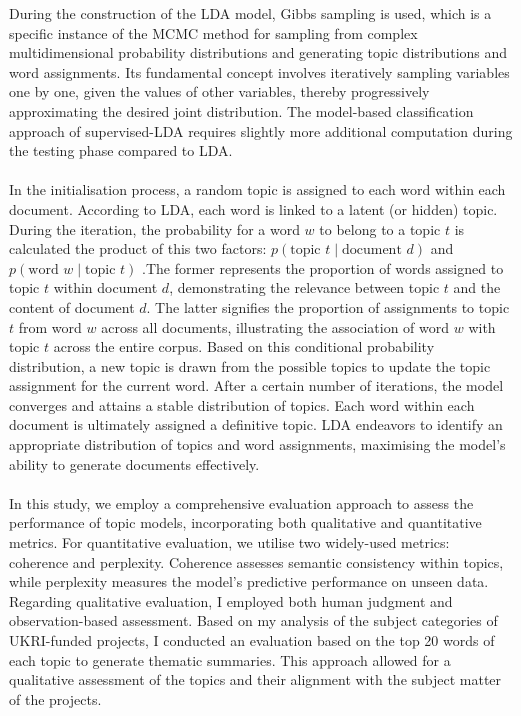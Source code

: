 \documentclass[12pt,twoside]{article}
\begin{document}
During the construction of the LDA model, Gibbs sampling is used, which is a specific instance of the MCMC method for sampling from complex multidimensional probability distributions and generating topic distributions and word assignments. Its fundamental concept involves iteratively sampling variables one by one, given the values of other variables, thereby progressively approximating the desired joint distribution. The model-based classification approach of supervised-LDA requires slightly more additional computation during the testing phase compared to LDA\cite{Lakshminarayanan2011}.\\\\

In the initialisation process, a random topic is assigned to each word within each document. According to LDA, each word is linked to a latent (or hidden) topic. During the iteration, the probability for a word $w$ to belong to a topic $t$ is calculated the product of this two factors: $p(\text{topic } t \mid \text{document } d)$ and $p(\text{word } w \mid \text{topic } t)$ \cite{Kulshrestha2019}.The former represents the proportion of words assigned to topic $t$ within document $d$, demonstrating the relevance between topic $t$ and the content of document $d$. The latter signifies the proportion of assignments to topic $t$ from word $w$ across all documents, illustrating the association of word $w$ with topic $t$ across the entire corpus. Based on this conditional probability distribution, a new topic is drawn from the possible topics to update the topic assignment for the current word. After a certain number of iterations, the model converges and attains a stable distribution of topics. Each word within each document is ultimately assigned a definitive topic. LDA endeavors to identify an appropriate distribution of topics and word assignments, maximising the model's ability to generate documents effectively.\\\\

In this study, we employ a comprehensive evaluation approach to assess the performance of topic models, incorporating both qualitative and quantitative metrics. For quantitative evaluation, we utilise two widely-used metrics: coherence and perplexity. Coherence assesses semantic consistency within topics, while perplexity measures the model's predictive performance on unseen data. Regarding qualitative evaluation, I employed both human judgment and observation-based assessment. Based on my analysis of the subject categories of UKRI-funded projects, I conducted an evaluation based on the top 20 words of each topic to generate thematic summaries. This approach allowed for a qualitative assessment of the topics and their alignment with the subject matter of the projects.\\\\
\end{document}
